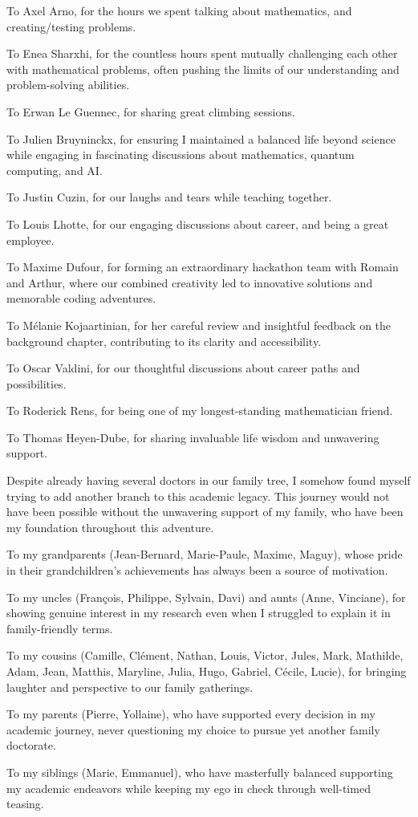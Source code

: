 To Axel Arno, for the hours we spent talking about mathematics, and creating/testing problems.

To Enea Sharxhi, for the countless hours spent mutually challenging each other with mathematical problems, often pushing the limits of our understanding and problem-solving abilities.

To Erwan Le Guennec, for sharing great climbing sessions.

To Julien Bruyninckx, for ensuring I maintained a balanced life beyond science while engaging in fascinating discussions about mathematics, quantum computing, and AI.

To Justin Cuzin, for our laughs and tears while teaching together.

To Louis Lhotte, for our engaging discussions about career, and being a great employee.

To Maxime Dufour, for forming an extraordinary hackathon team with Romain and Arthur, where our combined creativity led to innovative solutions and memorable coding adventures.

To Mélanie Kojaartinian, for her careful review and insightful feedback on the background chapter, contributing to its clarity and accessibility.

To Oscar Valdini, for our thoughtful discussions about career paths and possibilities.

To Roderick Rens, for being one of my longest-standing mathematician friend.

To Thomas Heyen-Dube, for sharing invaluable life wisdom and unwavering support.



Despite already having several doctors in our family tree, I somehow found myself trying to add another branch to this academic legacy.
This journey would not have been possible without the unwavering support of my family, who have been my foundation throughout this adventure.

To my grandparents (Jean-Bernard, Marie-Paule, Maxime, Maguy), whose pride in their grandchildren's achievements has always been a source of motivation.

To my uncles (François, Philippe, Sylvain, Davi) and aunts (Anne, Vinciane), for showing genuine interest in my research even when I struggled to explain it in family-friendly terms.

To my cousins (Camille, Clément, Nathan, Louis, Victor, Jules, Mark, Mathilde, Adam, Jean, Matthis, Maryline, Julia, Hugo, Gabriel, Cécile, Lucie), for bringing laughter and perspective to our family gatherings.

To my parents (Pierre, Yollaine), who have supported every decision in my academic journey, never questioning my choice to pursue yet another family doctorate.

To my siblings (Marie, Emmanuel), who have masterfully balanced supporting my academic endeavors while keeping my ego in check through well-timed teasing.



